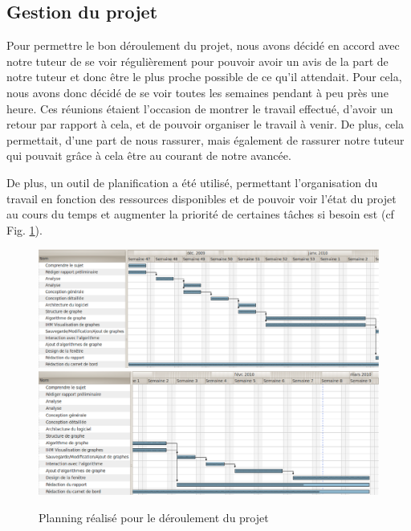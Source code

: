 \documentclass[11pt,a4paper]{article}
\begin{document}
		\subsection{Gestion du projet}
			
			Pour permettre le bon déroulement du projet, nous avons décidé en accord avec notre tuteur de se voir régulièrement pour pouvoir avoir un avis de la part de notre tuteur et donc être le plus proche possible de ce qu'il attendait. Pour cela, nous avons donc décidé de se voir toutes les semaines pendant à peu près une heure. Ces réunions étaient l'occasion de montrer le travail effectué, d'avoir un retour par rapport à cela, et de pouvoir organiser le travail à venir. De plus, cela permettait, d'une part de nous rassurer, mais également de rassurer notre tuteur qui pouvait grâce à cela être au courant de notre avancée.
			
			De plus, un outil de planification a été utilisé, permettant l'organisation du travail en fonction des ressources disponibles et de pouvoir voir l'état du projet au cours du temps et augmenter la priorité de certaines tâches si besoin est (cf Fig. \ref{img_gantt}).
			\begin{figure}[htbp]
				\begin{center}
					\includegraphics[scale=.4]{gantt.eps}
					\includegraphics[scale=.4]{gantt2.eps}					
				\end{center}
				\caption{Planning réalisé pour le déroulement du projet}
				\label{img_gantt}
			\end{figure}
	
	\newpage
\end{document}
